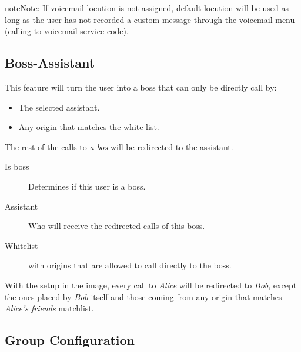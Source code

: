 \documentclass[letterpaper,10pt,english]{sphinxmanual}
\begin{document}
\begin{notice}{note}{Note:}
If voicemail locution is not assigned, default locution will be used as long as
the user has not recorded a custom message through the voicemail menu (calling to
voicemail service code).
\end{notice}


\subsection{Boss-Assistant}
\label{pbx_features/users:boss-assistant}

This feature will turn the user into a boss that can only be directly call by:
\begin{itemize}
\item {} 
The selected assistant.

\item {} 
Any origin that matches the white list.

\end{itemize}

The rest of the calls to \emph{a bos} will be redirected to the assistant.
\begin{description}
\item[{Is boss}] \leavevmode{}\label{pbx_features/users:term-is-boss}
Determines if this user is a boss.

\item[{Assistant}] \leavevmode{}\label{pbx_features/users:term-assistant}
Who will receive the redirected calls of this boss.

\item[{Whitelist}] \leavevmode{}\label{pbx_features/users:term-whitelist}
{\hyperref[pbx_features/match_lists:match\string-lists]{}} with origins that are allowed to call directly to
the boss.

\end{description}

With the setup in the image, every call to \emph{Alice} will be redirected to \emph{Bob},
except the ones placed by \emph{Bob} itself and those coming from any origin that matches
\emph{Alice's friends} matchlist.


\subsection{Group Configuration}
\label{pbx_features/users:group-configuration}
\noindent{}
\end{document}
